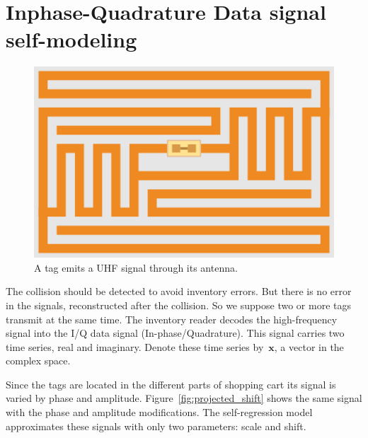 \documentclass[12pt]{article}
\begin{document}
\section{Inphase-Quadrature Data signal self-modeling}
\begin{figure}  %
\includegraphics[width=\linewidth]{EPC-RFID-TAG.svg.png}
\caption{A tag emits a UHF signal through its antenna.}
\label{fig:antenna}%
\end{figure} 
The collision should be detected to avoid inventory errors. But there is no error in the signals, reconstructed after the collision. So we suppose two or more tags transmit at the same time. The inventory reader decodes the high-frequency signal into the I/Q data signal (In-phase/Quadrature). This signal carries two time series, real and imaginary. Denote these time series by~$\mathbf{x}$, a vector in the complex space. 

Since the tags are located in the different parts of shopping cart its signal is varied by phase and amplitude. Figure~\ref{fig:projected_shift} shows the same signal with the phase and amplitude modifications. The self-regression model approximates these signals with only two parameters: scale and shift.
\end{document}
